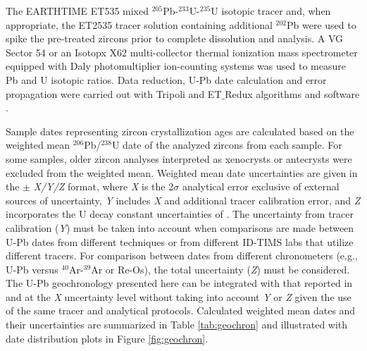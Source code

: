 \documentclass[11pt,letterpaper]{article}
\begin{document}
The EARTHTIME ET535 mixed $^{205}$Pb-$^{233}$U-$^{235}$U isotopic tracer and, when appropriate, the ET2535 tracer solution containing additional $^{202}$Pb \citep{Condon2015a, McLean2015a} were used to spike the pre-treated zircons prior to complete dissolution and analysis. A VG Sector 54 or an Isotopx X62 multi-collector thermal ionization mass spectrometer equipped with Daly photomultiplier ion-counting systems was used to measure Pb and U isotopic ratios. Data reduction, U-Pb date calculation and error propagation were carried out with Tripoli and ET$\_$Redux algorithms and software \citep{Bowring2011a, McLean2011a}.

Sample dates representing zircon crystallization ages are calculated based on the weighted mean $^{206}$Pb/$^{238}$U date of the analyzed zircons from each sample. For some samples, older zircon analyses interpreted as xenocrysts or antecrysts were excluded from the weighted mean. Weighted mean date uncertainties are given in the $\pm$ \textit{X/Y/Z} format, where \textit{X} is the 2$\sigma$ analytical error exclusive of external sources of uncertainty, \textit{Y} includes \textit{X} and additional tracer calibration error, and \textit{Z} incorporates the U decay constant uncertainties of \cite{Jaffey1971a}. The uncertainty from tracer calibration (\textit{Y}) must be taken into account when comparisons are made between U-Pb dates from different techniques or from different ID-TIMS labs that utilize different tracers. For comparison between dates from different chronometers (e.g., U-Pb versus $^{40}$Ar-$^{39}$Ar or Re-Os), the total uncertainty (\textit{Z}) must be considered. The U-Pb geochronology presented here can be integrated with that reported in \cite{Swanson-Hysell2014a} and \cite{Fairchild2017a} at the \textit{X} uncertainty level without taking into account \textit{Y} or \textit{Z} given the use of the same tracer and analytical protocols. Calculated weighted mean dates and their uncertainties are summarized in Table \ref{tab:geochron} and illustrated with date distribution plots in Figure \ref{fig:geochron}.
\end{document}
